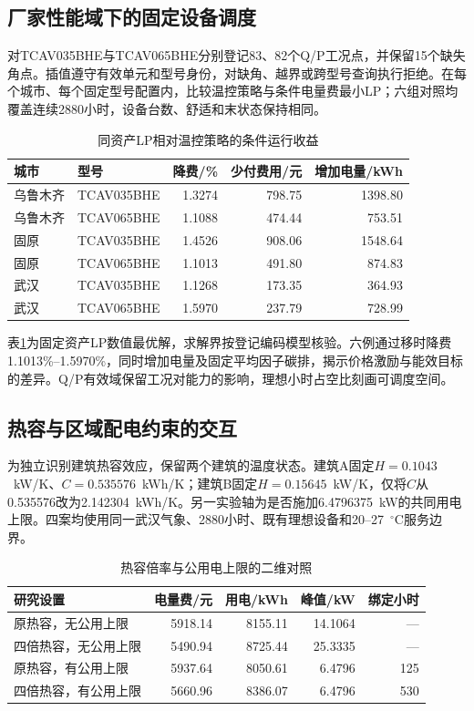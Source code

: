 \subsection{厂家性能域下的固定设备调度}

对TCAV035BHE与TCAV065BHE分别登记83、82个Q/P工况点，并保留15个缺失角点。插值遵守有效单元和型号身份，对缺角、越界或跨型号查询执行拒绝。在每个城市、每个固定型号配置内，比较温控策略与条件电量费最小LP；六组对照均覆盖连续2880小时，设备台数、舒适和末状态保持相同。

\begin{table}[htbp]
\centering
\caption{同资产LP相对温控策略的条件运行收益}\label{tab:heatpump}
\begin{tabularx}{\textwidth}{@{}lXrrr@{}}
\toprule
城市 & 型号 & 降费/\% & 少付费用/元 & 增加电量/kWh\\
\midrule
乌鲁木齐 & TCAV035BHE & 1.3274 & 798.75 & 1398.80\\
乌鲁木齐 & TCAV065BHE & 1.1088 & 474.44 & 753.51\\
固原 & TCAV035BHE & 1.4526 & 908.06 & 1548.64\\
固原 & TCAV065BHE & 1.1013 & 491.80 & 874.83\\
武汉 & TCAV035BHE & 1.1268 & 173.35 & 364.93\\
武汉 & TCAV065BHE & 1.5970 & 237.79 & 728.99\\
\bottomrule
\end{tabularx}
\end{table}

表\ref{tab:heatpump}为固定资产LP数值最优解，求解界按登记编码模型核验。六例通过移时降费1.1013\%--1.5970\%，同时增加电量及固定平均因子碳排，揭示价格激励与能效目标的差异。Q/P有效域保留工况对能力的影响，理想小时占空比刻画可调度空间。

\subsection{热容与区域配电约束的交互}

为独立识别建筑热容效应，保留两个建筑的温度状态。建筑A固定$H=0.1043$~kW/K、$C=0.535576$~kWh/K；建筑B固定$H=0.15645$~kW/K，仅将$C$从0.535576改为2.142304~kWh/K。另一实验轴为是否施加6.4796375~kW的共同用电上限。四案均使用同一武汉气象、2880小时、既有理想设备和20--27~$^\circ$C服务边界。

\begin{table}[htbp]
\centering
\caption{热容倍率与公用电上限的二维对照}\label{tab:factorial}
\begin{tabularx}{\textwidth}{@{}Xrrrr@{}}
\toprule
研究设置 & 电量费/元 & 用电/kWh & 峰值/kW & 绑定小时\\
\midrule
原热容，无公用上限 & 5918.14 & 8155.11 & 14.1064 & ---\\
四倍热容，无公用上限 & 5490.94 & 8725.44 & 25.3335 & ---\\
原热容，有公用上限 & 5937.64 & 8050.61 & 6.4796 & 125\\
四倍热容，有公用上限 & 5660.96 & 8386.07 & 6.4796 & 530\\
\bottomrule
\end{tabularx}
\end{table}

